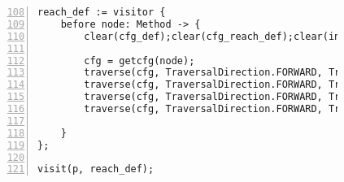 \begin{figure}[ht!]
\begin{lstlisting}[numbers=left, tabsize=4, caption={Loop invariant code motion},label={lst:lic-code}, firstline = 108, firstnumber = 108]
reach_def := visitor {
	before node: Method -> {
		clear(cfg_def);clear(cfg_reach_def);clear(init);clear(loops);clear(codemotion);clear(loop_invariant);

		cfg = getcfg(node);
		traverse(cfg, TraversalDirection.FORWARD, TraversalKind.HYBRID, cfg_def);
		traverse(cfg, TraversalDirection.FORWARD, TraversalKind.HYBRID, init);
		traverse(cfg, TraversalDirection.FORWARD, TraversalKind.HYBRID, cfg_reach_def, fixp1);
		traverse(cfg, TraversalDirection.FORWARD, TraversalKind.HYBRID, loop_invariant);
			
	}
};

visit(p, reach_def);
\end{lstlisting}
\end{figure}